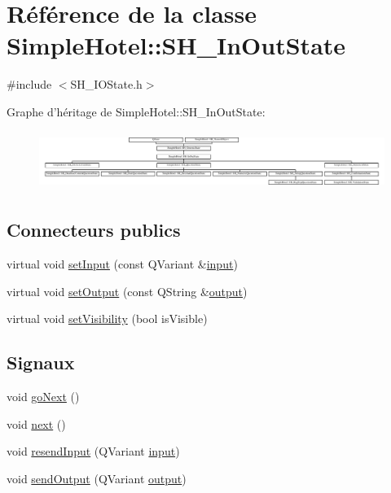 \hypertarget{classSimpleHotel_1_1SH__InOutState}{\section{Référence de la classe Simple\-Hotel\-:\-:S\-H\-\_\-\-In\-Out\-State}
\label{classSimpleHotel_1_1SH__InOutState}
}


{\ttfamily \#include $<$S\-H\-\_\-\-I\-O\-State.\-h$>$}

Graphe d'héritage de Simple\-Hotel\-:\-:S\-H\-\_\-\-In\-Out\-State\-:\begin{figure}[H]
\begin{center}
\leavevmode
\includegraphics[height=1.931035cm]{classSimpleHotel_1_1SH__InOutState}
\end{center}
\end{figure}
\subsection*{Connecteurs publics}
\begin{DoxyCompactItemize}
\item 
virtual void \hyperlink{classSimpleHotel_1_1SH__InOutState_a30d45824ca3c749427ac8d40479cf072}{set\-Input} (const Q\-Variant \&\hyperlink{classSimpleHotel_1_1SH__InOutState_a487d2ca6200fed372b1a27cfa27774db}{input})
\item 
virtual void \hyperlink{classSimpleHotel_1_1SH__InOutState_a5e151d7b01cceb6766b6d83d4a9ac1aa}{set\-Output} (const Q\-String \&\hyperlink{classSimpleHotel_1_1SH__InOutState_a71b15e4d49b9c2aa540500065ceb39da}{output})
\item 
virtual void \hyperlink{classSimpleHotel_1_1SH__InOutState_a2da1edbe247e9b2661c81c9dc2c7ef8d}{set\-Visibility} (bool is\-Visible)
\end{DoxyCompactItemize}
\subsection*{Signaux}
\begin{DoxyCompactItemize}
\item 
void \hyperlink{classSimpleHotel_1_1SH__GenericState_a5afea8cc17017b08b8db6d51b5bcefc4}{go\-Next} ()
\item 
void \hyperlink{classSimpleHotel_1_1SH__GenericState_a0ff6668857baab63d4f13c4d7175acbd}{next} ()
\item 
void \hyperlink{classSimpleHotel_1_1SH__InOutState_ab259648430e9e6e0667e79398c68c0d9}{resend\-Input} (Q\-Variant \hyperlink{classSimpleHotel_1_1SH__InOutState_a487d2ca6200fed372b1a27cfa27774db}{input})
\item 
void \hyperlink{classSimpleHotel_1_1SH__InOutState_a6f39ba3a9682ece4a0d2c96e8f8983a0}{send\-Output} (Q\-Variant \hyperlink{classSimpleHotel_1_1SH__InOutState_a71b15e4d49b9c2aa540500065ceb39da}{output})
\end{DoxyCompactItemize}
